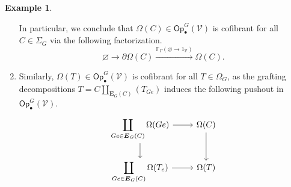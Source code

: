 \documentclass[a4paper,10pt
,draft
]{article}%
\numberwithin{equation}{section}
\numberwithin{figure}{section}
\theoremstyle{definition} %
\newtheorem{example}[equation]{Example}%
\newcommand{\Op}{\mathsf{Op}}%
\newcommand{\V}{\ensuremath{\mathcal V}}
\newcommand{\1}{\ensuremath{\mathbbm 1}}%
\begin{document}
\begin{example}
\begin{enumerate}[label = (\roman*)]
            In particular, we conclude that $\Omega(C) \in \Op^G_\bullet(\V)$ is cofibrant for all $C \in \Sigma_G$ via the following factorization.
            \[
                  \varnothing \to \partial\Omega(C) \xrightarrow{\mathbb F_{\Gamma}(\varnothing \to 1_\V)} \Omega(C).
            \]
      \item Similarly, $\Omega(T) \in \Op^G_\bullet(\V)$ is cofibrant for all $T \in \Omega_G$, as
            the grafting decompositions $T = C \coprod_{\boldsymbol{E}_G(C)} (T_{Ge})$ induces the following pushout in $\Op^G_\bullet(\V)$.
            \[
                  \begin{tikzcd}
                        \displaystyle{
                          \coprod_{Ge \in \boldsymbol{E}_G(C)} \Omega(Ge)}
                        \arrow[r] \arrow[d]
                        &
                        \Omega(C) \arrow[d]
                        \\
                        \displaystyle{
                          \coprod_{Ge \in \boldsymbol{E}_G(C)} \Omega(T_e)}
                        \arrow[r]
                        &
                        \Omega(T)
                  \end{tikzcd}
            \]            
      \end{enumerate}
\end{example}
\end{document}
